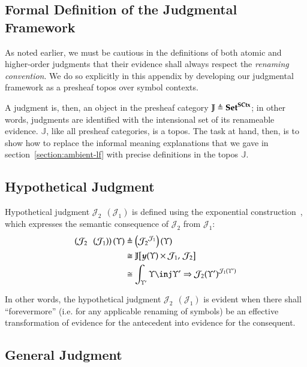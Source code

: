 \documentclass[11pt]{article}
\theoremstyle{definition}
\theoremstyle{remark}
\numberwithin{equation}{section}
\def\IModeColorName{MidnightBlue}
\def\OModeColorName{Maroon}
\def\IModeColorName{Black}
\def\OModeColorName{Black}
\newcommand\IMode[1]{{\color{\IModeColorName}{#1}}}
\newcommand\OMode[1]{{\color{\OModeColorName}{#1}}}
\newcommand\HypJ[2]{#1\ \ \left(#2\right)}
\newcommand\Sets{\mathbf{Set}}
\newcommand\SCtx{\mathbf{SCtx}}
\newcommand\Hom[3]{#1\!\left[#2,\,#3\right]}
\newcommand\Define[2]{\IMode{#1}\triangleq\OMode{#2}}
\newcommand\ADefine[2]{\IMode{#1}&\triangleq\OMode{#2}}
\newcommand\Yoneda[1]{\boldsymbol{y} (#1)}
\begin{document}
\newpage
\begin{appendices}
\section{Formal Definition of the Judgmental Framework}
\label{appendix:lf}

As noted earlier, we must be cautious in the definitions of both atomic and
higher-order judgments that their evidence shall always respect the
\emph{renaming convention}. We do so explicitly in this appendix by developing
our judgmental framework as a presheaf topos over symbol contexts.

A judgment is, then, an object in the presheaf category
$\Define{\mathbb{J}}{\Sets^\SCtx}$; in other words, judgments are identified
with the intensional set of its renameable evidence. $\mathbb{J}$, like all
presheaf categories, is a topos. The task at hand, then, is to show how to
replace the informal meaning explanations that we gave in
section~\ref{section:ambient-lf} with precise definitions in the topos
$\mathbb{J}$.

\subsection{Hypothetical Judgment}

Hypothetical judgment $\HypJ{\mathcal{J}_2}{\mathcal{J}_1}$ is defined using the
exponential construction~\cite[p.~46]{maclane-moerdijk:1992}, which expresses
the semantic consequence of $\mathcal{J}_2$ from $\mathcal{J}_1$:
\begin{align*}
  \ADefine{
    \left(\HypJ{\mathcal{J}_2}{\mathcal{J}_1}\right)(\Upsilon)
  }{
    \left({\mathcal{J}_2}^{\mathcal{J}_1}\right)(\Upsilon)
  }\\
  &\cong
  \OMode{
    \Hom{\mathbb{J}}{
      \Yoneda{\Upsilon}\times\mathcal{J}_1
    }{
      \mathcal{J}_2
    }
  }\\
  &\cong
  \OMode{
    \int_{\Upsilon'}{{\Upsilon\inj\Upsilon'}
      \Rightarrow{{{\mathcal{J}}_{2}(\Upsilon')}^{{\mathcal{J}}_{1}(\Upsilon')}}}
  }
\end{align*}

In other words, the hypothetical judgment $\HypJ{\mathcal{J}_2}{\mathcal{J}_1}$
is evident when there shall ``forevermore'' (i.e. for any applicable renaming
of symbols) be an effective transformation of evidence for the antecedent into
evidence for the consequent.

\subsection{General Judgment}


\end{appendices}
\end{document}
